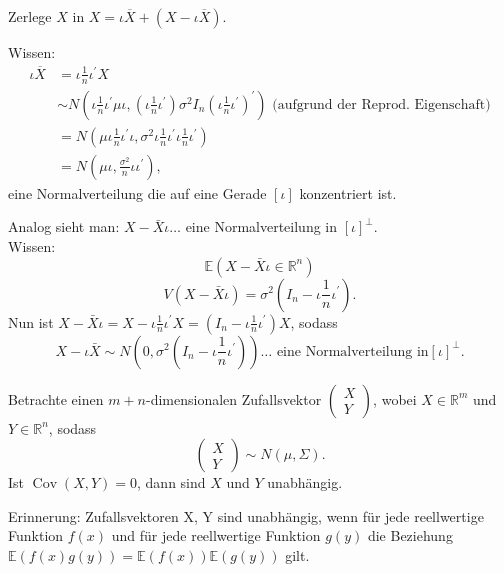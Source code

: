 \documentclass{tstextbook}
\begin{document}
\begin{example}
	Zerlege $X$ in $X=\iota\overline{X}+\left(X-\iota\overline{X}\right)$.
	
	Wissen:
	\begin{align*}
		\iota\overline{X} & =\iota\frac{1}{n}\iota^{\prime}X\\
		& \sim N\left(\iota\frac{1}{n}\iota^{\prime}\mu\iota,\left(\iota\frac{1}{n}\iota^{\prime}\right)\sigma^{2}I_{n}\left(\iota\frac{1}{n}\iota^{\prime}\right)^{\prime}\right)\text{ (aufgrund der Reprod. Eigenschaft)}\\
		& =N\left(\mu\iota\frac{1}{n}\iota^{\prime}\iota,\sigma^{2}\iota\frac{1}{n}\iota^{\prime}\iota\frac{1}{n}\iota^{\prime}\right)\\
		& =N\left(\mu\iota,\frac{\sigma^{2}}{n}\iota\iota^{\prime}\right),
	\end{align*}
	eine Normalverteilung die auf eine Gerade $[\iota]$ konzentriert
	ist.
	
	Analog sieht man:
	$X-\bar{X}\iota\ldots$ eine Normalverteilung in $ [\iota]^\perp. $\\
	Wissen: \\
	\[ \mathbb{E}\left( X-\bar{X}\iota\in\mathbb{R}^n\right) \]
	\[ V\left(X-\bar{X}\iota\right)=\sigma^2\left(I_n-\iota\frac{1}{n}\iota^{\prime}\right). \]
	Nun ist $ X-\bar{X}\iota=X-\iota\frac{1}{n}\iota^{\prime}X=\left(I_n-\iota \frac{1}{n}\iota^{\prime}\right)X $, sodass \[ X-\iota\bar{X}\sim N\left(0,\sigma^2\left(I_n-\iota\frac{1}{n}\iota^{\prime}\right)\right)\ldots\text{ eine Normalverteilung in}[\iota]^{\perp}.\]
	
	\end{example}

\begin{theorem}
	
	Betrachte einen $ m+n $-dimensionalen Zufallsvektor $ \begin{pmatrix} X \\ Y\end{pmatrix} $, wobei $ X \in \mathbb{R}^m $ und $ Y \in \mathbb{R}^n $, sodass 
	\[ \begin{pmatrix}	X \\ Y \end{pmatrix} \sim N(\mu, \Sigma). \]
	Ist $ \operatorname{Cov} (X , Y) = 0 $, dann sind $ X $ und $ Y $ unabhängig.
\end{theorem}

\begin{remark}
	
	Erinnerung: Zufallsvektoren X, Y sind unabhängig, wenn für jede reellwertige Funktion $ f(x) $  und für jede reellwertige Funktion $ g(y) $ die Beziehung $ \mathbb{E}\left(f(x)g(y)\right)=\mathbb{E}\left(f(x)\right) \mathbb{E}\left(g(y)\right)$ gilt.
	
	\end{remark}
\end{document}
